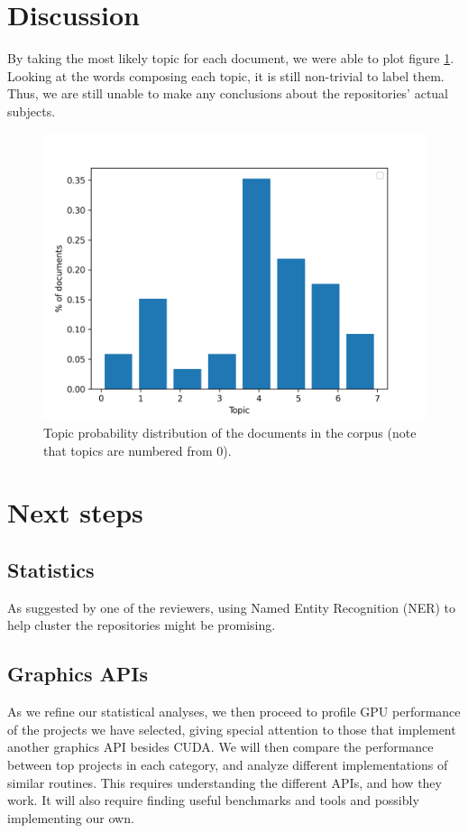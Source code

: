 \documentclass[12pt]{article}
\begin{document}
\section{Discussion} \label{sec:discussion}

By taking the most likely topic for each document, we were able to plot
figure \ref{fig:topic-probabilities}.
Looking at the words composing each topic, it is still non-trivial to label
them.
Thus, we are still unable to make any conclusions about the repositories'
actual subjects.

\begin{figure}[ht]
    \centering
    \includegraphics[width=0.7\linewidth]{topic-probabilities.png}
    \caption{Topic probability distribution of the documents in the corpus
    (note that topics are numbered from 0).}
    \label{fig:topic-probabilities}
\end{figure}

\section{Next steps} \label{sec:next-steps}

\subsection{Statistics} \label{sec:next-steps:statistics}

As suggested by one of the reviewers, using Named Entity Recognition (NER) to
help cluster the repositories might be promising.

\subsection{Graphics APIs} \label{sec:next-steps:apis}

As we refine our statistical analyses, we then proceed to profile GPU
performance of the projects we have selected, giving special attention to those
that implement another graphics API besides CUDA.
We will then compare the performance between top projects in each category, and
analyze different implementations of similar routines.
This requires understanding the different APIs, and how they work.
It will also require finding useful benchmarks and tools and possibly
implementing our own.



\end{document}
